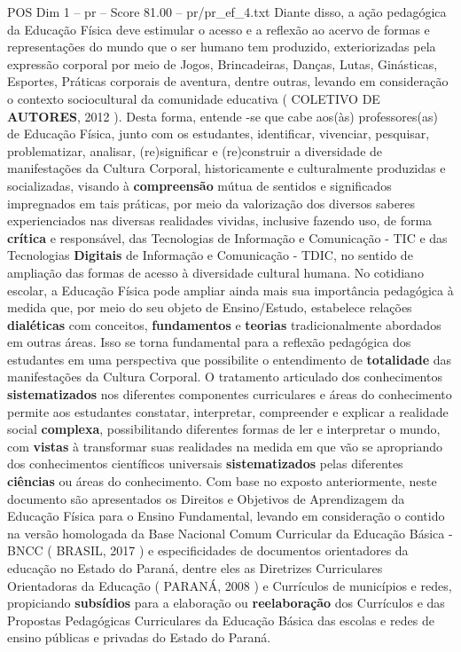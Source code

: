 \begin{textsample}{POS Dim 1 – pr – Score 81.00 – pr/pr\_ef\_4.txt}
Diante disso, a ação pedagógica da Educação Física deve estimular o acesso e a reflexão ao acervo de formas e representações do mundo que o ser humano tem produzido, exteriorizadas pela expressão corporal por meio de Jogos, Brincadeiras, Danças, Lutas, Ginásticas, Esportes, Práticas corporais de aventura, dentre outras, levando em consideração o contexto sociocultural da comunidade educativa ( COLETIVO DE \textbf{AUTORES}, 2012 ).
Desta forma, entende -se que cabe aos(às) professores(as) de Educação Física, junto com os estudantes, identificar, vivenciar, pesquisar, problematizar, analisar, (re)significar e (re)construir a diversidade de manifestações da Cultura Corporal, historicamente e culturalmente produzidas e socializadas, visando à \textbf{compreensão} mútua de sentidos e significados impregnados em tais práticas, por meio da valorização dos diversos saberes experienciados nas diversas realidades vividas, inclusive fazendo uso, de forma \textbf{crítica} e responsável, das Tecnologias de Informação e Comunicação - TIC e das Tecnologias \textbf{Digitais} de Informação e Comunicação - TDIC, no sentido de ampliação das formas de acesso à diversidade cultural humana.
No cotidiano escolar, a Educação Física pode ampliar ainda mais sua importância pedagógica à medida que, por meio do seu objeto de Ensino/Estudo, estabelece relações \textbf{dialéticas} com conceitos, \textbf{fundamentos} e \textbf{teorias} tradicionalmente abordados em outras áreas.
Isso se torna fundamental para a reflexão pedagógica dos estudantes em uma perspectiva que possibilite o entendimento de \textbf{totalidade} das manifestações da Cultura Corporal.
O tratamento articulado dos conhecimentos \textbf{sistematizados} nos diferentes componentes curriculares e áreas do conhecimento permite aos estudantes constatar, interpretar, compreender e explicar a realidade social \textbf{complexa}, possibilitando diferentes formas de ler e interpretar o mundo, com \textbf{vistas} à transformar suas realidades na medida em que vão se apropriando dos conhecimentos científicos universais \textbf{sistematizados} pelas diferentes \textbf{ciências} ou áreas do conhecimento.
Com base no exposto anteriormente, neste documento são apresentados os Direitos e Objetivos de Aprendizagem da Educação Física para o Ensino Fundamental, levando em consideração o contido na versão homologada da Base Nacional Comum Curricular da Educação Básica - BNCC ( BRASIL, 2017 ) e especificidades de documentos orientadores da educação no Estado do Paraná, dentre eles as Diretrizes Curriculares Orientadoras da Educação ( PARANÁ, 2008 ) e Currículos de municípios e redes, propiciando \textbf{subsídios} para a elaboração ou \textbf{reelaboração} dos Currículos e das Propostas Pedagógicas Curriculares da Educação Básica das escolas e redes de ensino públicas e privadas do Estado do Paraná.

\end{textsample}

